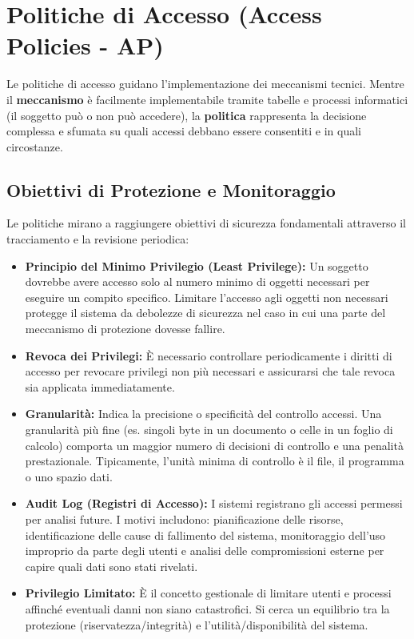 \documentclass{article}
\begin{document}
\vspace{0.8cm}

\section*{Politiche di Accesso (Access Policies - AP)}

Le politiche di accesso guidano l'implementazione dei meccanismi tecnici. Mentre il \textbf{meccanismo} è facilmente implementabile tramite tabelle e processi informatici (il soggetto può o non può accedere), la \textbf{politica} rappresenta la decisione complessa e sfumata su quali accessi debbano essere consentiti e in quali circostanze.

\subsection*{Obiettivi di Protezione e Monitoraggio}

Le politiche mirano a raggiungere obiettivi di sicurezza fondamentali attraverso il tracciamento e la revisione periodica:

\begin{itemize}
    \item \textbf{Principio del Minimo Privilegio (Least Privilege):} Un soggetto dovrebbe avere accesso solo al numero minimo di oggetti necessari per eseguire un compito specifico. Limitare l'accesso agli oggetti non necessari protegge il sistema da debolezze di sicurezza nel caso in cui una parte del meccanismo di protezione dovesse fallire.
    \item \textbf{Revoca dei Privilegi:} È necessario controllare periodicamente i diritti di accesso per revocare privilegi non più necessari e assicurarsi che tale revoca sia applicata immediatamente.
    \item \textbf{Granularità:} Indica la precisione o specificità del controllo accessi. Una granularità più fine (es. singoli byte in un documento o celle in un foglio di calcolo) comporta un maggior numero di decisioni di controllo e una penalità prestazionale. Tipicamente, l'unità minima di controllo è il file, il programma o uno spazio dati.
    \item \textbf{Audit Log (Registri di Accesso):} I sistemi registrano gli accessi permessi per analisi future. I motivi includono: pianificazione delle risorse, identificazione delle cause di fallimento del sistema, monitoraggio dell'uso improprio da parte degli utenti e analisi delle compromissioni esterne per capire quali dati sono stati rivelati.
    \item \textbf{Privilegio Limitato:} È il concetto gestionale di limitare utenti e processi affinché eventuali danni non siano catastrofici. Si cerca un equilibrio tra la protezione (riservatezza/integrità) e l'utilità/disponibilità del sistema.
\end{itemize}
\end{document}
